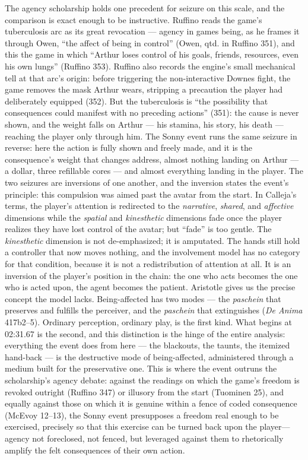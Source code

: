 The agency scholarship holds one precedent for seizure on this scale, and the comparison is exact enough to be instructive. Ruffino reads the game's tuberculosis arc as its great revocation — agency in games being, as he frames it through Owen, ``the affect of being in control'' (Owen, qtd. in Ruffino 351), and this the game in which ``Arthur loses control of his goals, friends, resources, even his own lungs'' (Ruffino 353). Ruffino also records the engine's small mechanical tell at that arc's origin: before triggering the non-interactive Downes fight, the game removes the mask Arthur wears, stripping a precaution the player had deliberately equipped (352). But the tuberculosis is ``the possibility that consequences could manifest with no preceding actions'' (351): the cause is never shown, and the weight falls on Arthur — his stamina, his story, his death — reaching the player only through him. The Sonny event runs the same seizure in reverse: here the action is fully shown and freely made, and it is the consequence's weight that changes address, almost nothing landing on Arthur — a dollar, three refillable cores — and almost everything landing in the player. The two seizures are inversions of one another, and the inversion states the event's principle: this compulsion was aimed past the avatar from the start. In Calleja's terms, the player's attention is redirected to the \textit{narrative}, \textit{shared}, and \textit{affective} dimensions while the \textit{spatial} and \textit{kinesthetic} dimensions fade once the player realizes they have lost control of the avatar; but ``fade'' is too gentle. The \textit{kinesthetic} dimension is not de-emphasized; it is amputated. The hands still hold a controller that now moves nothing, and the involvement model has no category for that condition, because it is not a redistribution of attention at all. It is an inversion of the player's position in the chain: the one who acts becomes the one who is acted upon, the agent becomes the patient. Aristotle gives us the precise concept the model lacks. Being-affected has two modes --- the \textit{paschein} that preserves and fulfills the perceiver, and the \textit{paschein} that extinguishes (\textit{De Anima} 417b2--5). Ordinary perception, ordinary play, is the first kind. What begins at 02:31.67 is the second, and this distinction is the hinge of the entire analysis: everything the event does from here --- the blackouts, the taunts, the itemized hand-back --- is the destructive mode of being-affected, administered through a medium built for the preservative one.
This is where the event outruns the scholarship's agency debate: against the readings on which the game's freedom is revoked outright (Ruffino 347) or illusory from the start (Tuominen 25), and equally against those on which it is genuine within a fence of coded consequence (McEvoy 12--13), the Sonny event presupposes a freedom real enough to be exercised, precisely so that this exercise can be turned back upon the player---agency not foreclosed, not fenced, but leveraged against them to rhetorically amplify the felt consequences of their own action.

